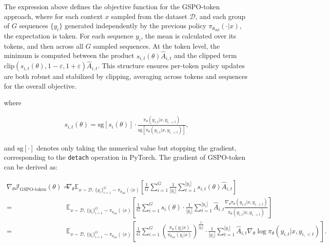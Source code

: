 The expression above defines the objective function for the GSPO-token approach, where for each context $x$ sampled from the dataset $\mathcal{D}$, and each group of $G$ sequences $\{y_i\}$ generated independently by the previous policy $\pi_{\theta_\text{old}}(\cdot|x)$, the expectation is taken. For each sequence $y_i$, the mean is calculated over its tokens, and then across all $G$ sampled sequences. At the token level, the minimum is computed between the product $s_{i,t}(\theta)\widehat{A}_{i,t}$ and the clipped term $\mathrm{clip}(s_{i,t}(\theta), 1 - \varepsilon, 1 + \varepsilon)\widehat{A}_{i,t}$. This structure ensures per-token policy updates are both robust and stabilized by clipping, averaging across tokens and sequences for the overall objective.

where

\begin{align}
s_{i,t}(\theta) 
= \mathrm{sg} \left[ s_{i}(\theta) \right]  \cdot \frac{ \pi_{\theta} (y_{i,t} | x, y_{i,<t}) }{ \mathrm{sg} \left[ \pi_{\theta} (y_{i,t} | x, y_{i,<t}) \right] },
\end{align}

and $\mathrm{sg}[\cdot]$ denotes only taking the numerical value but stopping the gradient, corresponding to the \texttt{detach} operation in PyTorch. The gradient of GSPO-token can be derived as:

\begin{align}
\nabla_{\theta} \mathcal{J}_\text{GSPO-token}(\theta)
=&\ 
\nabla_{\theta} \mathbb{E}_{ x \sim \mathcal{D},\, \{y_i\}_{i=1}^G \sim \pi_{\theta_\text{old}}( \cdot | x) }
\left[ 
\frac{1}{G} \sum_{i=1}^{G}
\frac{1}{|y_i|} \sum_{t=1}^{|y_i|} 
s_{i,t}(\theta) \widehat{A}_{i,t}
\right] \\
=&\ 
\mathbb{E}_{ x \sim \mathcal{D},\, \{y_i\}_{i=1}^G \sim \pi_{\theta_\text{old}}( \cdot | x) }
\left[ 
\frac{1}{G} \sum_{i=1}^{G} s_i (\theta) \cdot \frac{1}{|y_i|} \sum_{t=1}^{|y_i|} 
\widehat{A}_{i,t} \frac{ \nabla_{\theta} \pi_{\theta} (y_{i,t} | x, y_{i,<t}) }{ \pi_{\theta} (y_{i,t} | x, y_{i,<t}) }
\right] \\
=&\ 
\mathbb{E}_{ x \sim \mathcal{D},\, \{y_i\}_{i=1}^G \sim \pi_{\theta_\text{old}}( \cdot | x) }
\left[ 
\frac{1}{G} \sum_{i=1}^{G}  \left( \frac{ \pi_{\theta} (y_i | x) }{ \pi_{\theta_\text{old}} (y_i | x)} \right)^{\frac{1}{|y_i|}}
\cdot \frac{1}{|y_i|} \sum_{t=1}^{|y_i|}
\widehat{A}_{i,t} \nabla_{\theta} \log \pi_{\theta} (y_{i,t} | x, y_{i,<t})  
\right].
\label{equ:gspo-token_grad}
\end{align}

